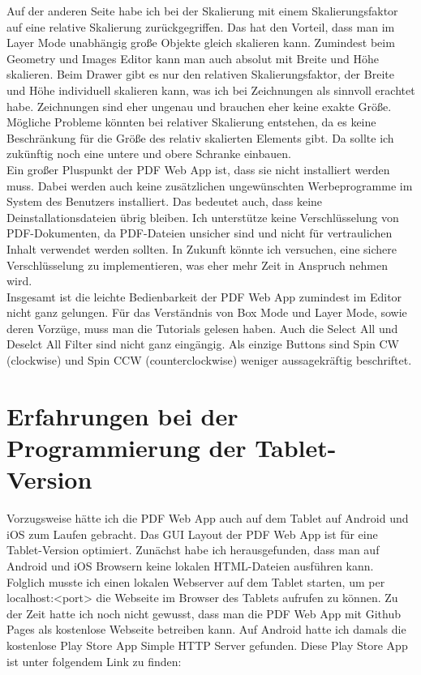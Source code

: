 Auf der anderen Seite habe ich bei der Skalierung mit einem Skalierungsfaktor auf eine relative Skalierung zurückgegriffen. Das hat den Vorteil, dass man im Layer Mode unabhängig große Objekte gleich skalieren kann. Zumindest beim Geometry und Images Editor kann man auch absolut mit Breite und Höhe skalieren. Beim Drawer gibt es nur den relativen Skalierungsfaktor, der Breite und Höhe individuell skalieren kann, was ich bei Zeichnungen als sinnvoll erachtet habe. Zeichnungen sind eher ungenau und brauchen eher keine exakte Größe. Mögliche Probleme könnten bei relativer Skalierung entstehen, da es keine Beschränkung für die Größe des relativ skalierten Elements gibt. Da sollte ich zukünftig noch eine untere und obere Schranke einbauen. \\
Ein großer Pluspunkt der PDF Web App ist, dass sie nicht installiert werden muss. Dabei werden auch keine zusätzlichen ungewünschten Werbeprogramme im System des Benutzers installiert. Das bedeutet auch, dass keine Deinstallationsdateien übrig bleiben. Ich unterstütze keine Verschlüsselung von PDF-Dokumenten, da PDF-Dateien unsicher sind und nicht für vertraulichen Inhalt verwendet werden sollten. In Zukunft könnte ich versuchen, eine sichere Verschlüsselung zu implementieren, was eher mehr Zeit in Anspruch nehmen wird. \\
Insgesamt ist die leichte Bedienbarkeit der PDF Web App zumindest im Editor nicht ganz gelungen. Für das Verständnis von Box Mode und Layer Mode, sowie deren Vorzüge, muss man die Tutorials gelesen haben. Auch die Select All und Deselct All Filter sind nicht ganz eingängig. Als einzige Buttons sind Spin CW (clockwise) und Spin CCW (counterclockwise) weniger aussagekräftig beschriftet.

\section{Erfahrungen bei der Programmierung der Tablet-Version}
Vorzugsweise hätte ich die PDF Web App auch auf dem Tablet auf Android und iOS zum Laufen gebracht. Das GUI Layout der PDF Web App ist für eine Tablet-Version optimiert. Zunächst habe ich herausgefunden, dass man auf Android und iOS Browsern keine lokalen HTML-Dateien ausführen kann. Folglich musste ich einen lokalen Webserver auf dem Tablet starten, um per localhost:<port> die Webseite im Browser des Tablets aufrufen zu können. Zu der Zeit hatte ich noch nicht gewusst, dass man die PDF Web App mit Github Pages als kostenlose Webseite betreiben kann. Auf Android hatte ich damals die kostenlose Play Store App Simple HTTP Server gefunden. Diese Play Store App ist unter folgendem Link zu finden:


